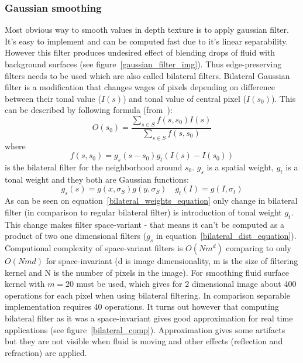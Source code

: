 \subsubsection{Gaussian smoothing} \label{sec:gaussiansmoothing}
Most obvious way to smooth values in depth texture is to apply gaussian filter. It's easy to implement and can be computed fast due to it's linear separability. However this filter produces undesired effect of blending drops of fluid with background surfaces (see figure~\ref{gaussian_filter_img}). 
Thus edge-preserving filters needs to be used which are also called bilateral filters. Bilateral Gaussian filter is a modification that changes wages of pixels depending on difference between their tonal value ($I(s)$) and tonal value of central pixel ($I(s_0)$). This can be described by following formula (from~\cite{PhamVliet2005}): 
\begin{equation}
\label{bilateral_equation}
O(s_0) = \frac{\sum_{s \in S}f(s, s_0)I(s)}{\sum_{s \in S}f(s, s_0)}
\end{equation}
where 
\begin{equation}
\label{bilateral_weights_equation}
f(s, s_0) = g_s(s-s_0)g_t(I(s)-I(s_0))
\end{equation}
is the bilateral filter for the neighborhood around $s_0$. $g_s$ is a spatial weight, $g_t$ is a tonal weight and they both are Gaussian functions:
\begin{equation}
\label{bilateral_dist_equation}
g_s(s) = g(x, \sigma_S)g(y, \sigma_S)  \quad   g_t(I) = g(I, \sigma_t)
\end{equation}
As can be seen on equation~\ref{bilateral_weights_equation} only change in bilateral filter (in comparison to regular bilateral filter) is introduction of tonal weight $g_t$. This change makes filter space-variant - that means it can't be computed as a product of two one dimensional filters ($g_s$ in equation~\ref{bilateral_dist_equation}). 
Computional complexity of space-variant filters is $O(Nm^d)$ comparing to only $O(Nmd)$ for space-invariant (d is image dimensionality, m is the size of filtering kernel and N is the number of pixels in the image). For smoothing fluid surface kernel with $m = 20$ must be used, which gives for 2 dimensional image about 400 operations for each pixel when using bilateral filtering. In comparison separable implementation requires 40 operations. It turns out however that computing bilateral filter as it was a space-invariant gives good approximation for real time applications (see figure~\ref{bilateral_comp}). Approximation gives some artifacts but they are not visible when fluid is moving and other effects (reflection and refraction) are applied.

